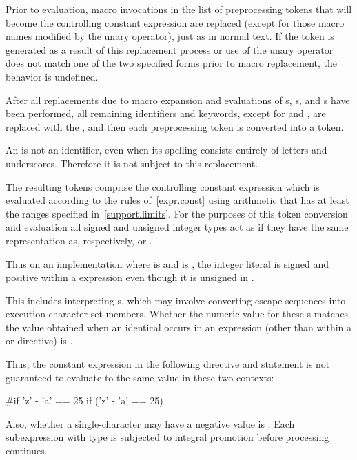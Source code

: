 \pnum
Prior to evaluation,
macro invocations in the list of preprocessing tokens
that will become the controlling constant expression
are replaced
(except for those macro names modified by the
unary operator),
just as in normal text.
If the token
is generated as a result of this replacement process
or use of the
unary operator does not match one of the two specified forms
prior to macro replacement,
the behavior is undefined.

\pnum
After all replacements due to macro expansion and
evaluations of
s,
s, and
s
have been performed,
all remaining identifiers and keywords,
except for
and
,
are replaced with the 
,
and then each preprocessing token is converted into a token.
\begin{note}
An  is not an identifier,
even when its spelling consists entirely of letters and underscores.
Therefore it is not subject to this replacement.
\end{note}

\pnum
The resulting tokens comprise the controlling constant expression
which is evaluated according to the rules of~\ref{expr.const}
using arithmetic that has at least the ranges specified
in~\ref{support.limits}. For the purposes of this token conversion and evaluation
all signed and unsigned integer types
act as if they have the same representation as, respectively,
 or .
\begin{note}
Thus on an
implementation where  is 
and  is ,
the integer literal  is signed and positive within a 
expression even though it is unsigned in .
\end{note}
This includes interpreting s, which may involve
converting escape sequences into execution character set members.
Whether the numeric value for these s
matches the value obtained when an identical 
occurs in an expression
(other than within a
or
directive)
is .
\begin{note}
Thus, the constant expression in the following
directive and
 statement
is not guaranteed to evaluate to the same value in these two
contexts:
\begin{codeblock}
#if 'z' - 'a' == 25
if ('z' - 'a' == 25)
\end{codeblock}
\end{note}
Also, whether a single-character  may have a negative
value is .
Each subexpression with type
is subjected to integral promotion before processing continues.

